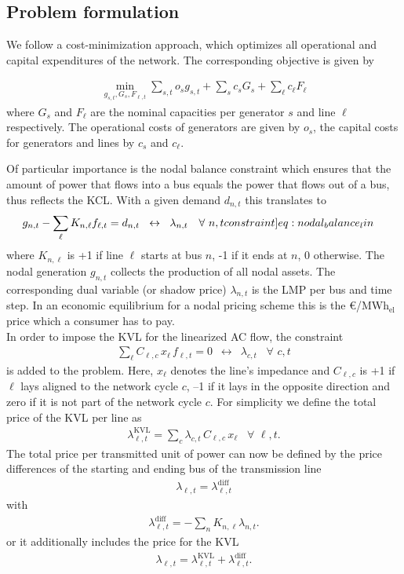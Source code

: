 \documentclass[11pt,twocolumn]{article}
\newcommand{\resultsin}[1]{\hspace{6pt} \leftrightarrow  \hspace{6pt} #1}
\newcommand{\Forall}[1]{\hspace{10pt} \forall \,\, #1 }
\newcommand{\nodalgeneration}[1][n]{g_{#1,t}}
\newcommand{\flow}{f_{\ell,t}}
\newcommand{\lmp}[1][n]{\lambda_{#1,t}}
\newcommand{\lmpdiff}[1][\ell]{\lmp[#1]^\text{diff}}
\newcommand{\lmpkvl}[1][\ell]{\lmp[#1]^\text{KVL}}
\newcommand{\demand}[1][n]{d_{#1,t}}
\newcommand{\incidence}[1][n]{K_{#1,\ell}}
\newcommand{\cycle}{C_{\ell,c}}
\newcommand{\reactance}{x_\ell}
\newcommand{\cycleprice}{\lambda_{c,t}}
\newcommand{\megawatthour}{MWh$_\text{el}$}
\begin{document}
\subsection{Problem formulation}
\label{sec:problem_formulation}

We follow a cost-minimization approach, which optimizes all operational and capital expenditures of the network. The corresponding objective is given by

\begin{align}
    \min_{g_{s,t}, G_s, F_{\ell, t}} \sum_{s,t} o_s g_{s,t} + \sum_s c_s G_s + \sum_\ell c_\ell F_\ell
\end{align}
where $G_s$ and $F_\ell$ are the nominal capacities per generator $s$ and line $\ell$ respectively. The operational costs of generators are given by $o_s$, the capital costs for generators and lines by $c_s$ and $c_\ell$.

Of particular importance is the nodal balance constraint which ensures that the amount of power that flows into a bus equals the power that flows out of a bus, thus reflects the \ac{KCL}. With a given demand $\demand$ this translates to
\begin{align}
    \nodalgeneration - \sum_\ell \incidence \flow & =  \demand
    \resultsin{\lmp} \Forall{n,t}
    \label[constraint]{eq:nodal_balance_lin}
\end{align}
where $\incidence$ is +1 if line $\ell$ starts at bus $n$, -1 if it ends at $n$, 0 otherwise. The nodal generation $\nodalgeneration$ collects the production of all nodal assets. The corresponding dual variable (or shadow price) $\lmp$ is the \ac{LMP} per bus and time step. In an economic equilibrium for a nodal pricing scheme this is the \euro/\megawatthour\, price which a consumer has to pay.\\

In order to impose the \ac{KVL} for the linearized \ac{AC} flow, the constraint
\begin{align}
    \sum_{\ell} \cycle \, \reactance \, \flow = 0 \resultsin{\cycleprice} \Forall{c,t}
\end{align}
is added to the problem. Here, $\reactance$ denotes the line's impedance and $\cycle$ is +1 if $\ell$ lays aligned to the network cycle $c$, --1 if it lays in the opposite direction and zero if it is not part of the network cycle $c$.
For simplicity we define the total price of the \ac{KVL} per line as
\begin{align}
    \lmpkvl = \sum_c \cycleprice\, \cycle\, \reactance \Forall{\ell,t} .
\end{align}
The total price per transmitted unit of power can now be defined by the price differences of the starting and ending bus of the transmission line
\begin{align}
    \lmp[\ell] = \lmpdiff
\end{align}
with
\begin{align}
    \lmpdiff = -\sum_n \incidence \lmp .
\end{align}
or it additionally includes the price for the \ac{KVL}
\begin{align}
    \lmp[\ell] = \lmpkvl + \lmpdiff .
    \label{eq:congestion_price}
\end{align}
\end{document}
